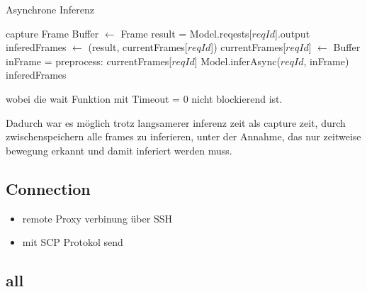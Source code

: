 \begin{algorithm}[H]
    \caption{Asynchrone Inferenz}
    \begin{algorithmic}
    \WHILE{\TRUE}
        \STATE capture Frame
            \STATE Buffer $\leftarrow$ Frame
        \ENDIF
                \STATE result = Model.reqests[$reqId$].output
                \STATE inferedFrames $\leftarrow$ (result, currentFrames[$reqId$])
                    \STATE currentFrames[$reqId$] $\leftarrow$ Buffer 
                    \STATE inFrame = preprocess: currentFrames[$reqId$]
                    \STATE Model.inferAsync($reqId$, inFrame)
                \ENDIF
            \ENDIF
        \ENDFOR
        \RETURN inferedFrames
    \ENDWHILE
    \end{algorithmic}
\end{algorithm}

wobei die wait Funktion mit Timeout = 0 nicht blockierend ist.

Dadurch war es möglich trotz langsamerer inferenz zeit als 
capture zeit, durch zwischenspeichern alle frames zu inferieren, 
unter der Annahme, das nur zeitweise bewegung erkannt und damit 
inferiert werden muss.



\subsection*{Connection}

\begin{itemize}
    \item remote Proxy verbinung über SSH
    \item mit SCP Protokol send
\end{itemize}

\newpage
\subsection{all}



\newpage

%

\begin{figure}[H]
    \centering
    \def\svgwidth{0.8\textwidth}
    
    \caption{}
    \label{}
\end{figure}

\vspace{2cm}

